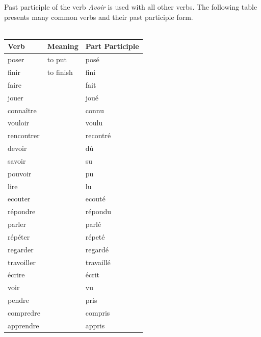 \noindent Past participle of the verb \emph{Avoir} is used with all other verbs.
The following table presents many common verbs and their past participle form.\\\\

\begin{longtable}{| l | l | l |}
\hline
Verb            & Meaning             & Part Participle \\
\hline
\endhead
poser         & to put      &  pos\'e  \\ \hline
finir         & to finish   &  fini    \\ \hline
faire  & & fait \\ \hline
jouer & & jou\'e \\ \hline
conna\^itre & & connu \\ \hline
vouloir & & voulu \\ \hline
rencontrer & & recontr\'e \\ \hline
devoir & & d\^u \\ \hline
savoir & & su \\ \hline
pouvoir & & pu \\ \hline
lire & & lu \\ \hline
ecouter & & ecout\'e \\ \hline
r\'epondre & & r\'epondu \\ \hline
parler & & parl\'e \\ \hline
r\'ep\'eter & & r\'epet\'e \\ \hline
regarder & & regard\'e \\ \hline
travoiller & & travaill\'e \\ \hline
\'ecrire && \'ecrit \\ \hline
voir && vu \\ \hline
pendre && pris \\ \hline
compredre && compris \\ \hline
apprendre && appris \\ \hline
\end{longtable}



